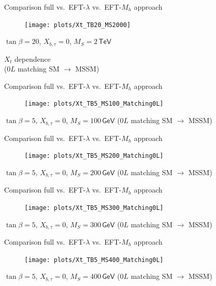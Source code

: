 \documentclass[hyperref={pdfpagelabels=false},ngerman]{beamer}
\newcommand{\eh}[1]{\,\mathsf{#1}}
\begin{document}
\begin{frame}[noframenumbering]{Comparison full vs.\ EFT-$\lambda$ vs.\ EFT-$M_h$ approach}
  \begin{figure}
    \centering
    \texttt{[image: plots/Xt\_TB20\_MS2000]}
  \end{figure}
  $\tan\beta = 20$, $X_{b,\tau} = 0$, $M_S = 2\eh{TeV}$
\end{frame}


\begin{frame}[noframenumbering]
  \begin{center}
    {\Large $X_t$ dependence}\\[1em]
    ($0L$ matching SM $\rightarrow$ MSSM)
  \end{center}
\end{frame}

\begin{frame}[noframenumbering]{Comparison full vs.\ EFT-$\lambda$ vs.\ EFT-$M_h$ approach}
  \begin{figure}
    \centering
    \texttt{[image: plots/Xt\_TB5\_MS100\_Matching0L]}
  \end{figure}
  $\tan\beta = 5$, $X_{b,\tau} = 0$, $M_S = 100\eh{GeV}$ ($0L$ matching SM $\rightarrow$ MSSM)
\end{frame}

\begin{frame}[noframenumbering]{Comparison full vs.\ EFT-$\lambda$ vs.\ EFT-$M_h$ approach}
  \begin{figure}
    \centering
    \texttt{[image: plots/Xt\_TB5\_MS200\_Matching0L]}
  \end{figure}
  $\tan\beta = 5$, $X_{b,\tau} = 0$, $M_S = 200\eh{GeV}$ ($0L$ matching SM $\rightarrow$ MSSM)
\end{frame}

\begin{frame}[noframenumbering]{Comparison full vs.\ EFT-$\lambda$ vs.\ EFT-$M_h$ approach}
  \begin{figure}
    \centering
    \texttt{[image: plots/Xt\_TB5\_MS300\_Matching0L]}
  \end{figure}
  $\tan\beta = 5$, $X_{b,\tau} = 0$, $M_S = 300\eh{GeV}$ ($0L$ matching SM $\rightarrow$ MSSM)
\end{frame}

\begin{frame}[noframenumbering]{Comparison full vs.\ EFT-$\lambda$ vs.\ EFT-$M_h$ approach}
  \begin{figure}
    \centering
    \texttt{[image: plots/Xt\_TB5\_MS400\_Matching0L]}
  \end{figure}
  $\tan\beta = 5$, $X_{b,\tau} = 0$, $M_S = 400\eh{GeV}$ ($0L$ matching SM $\rightarrow$ MSSM)
\end{frame}
\end{document}
